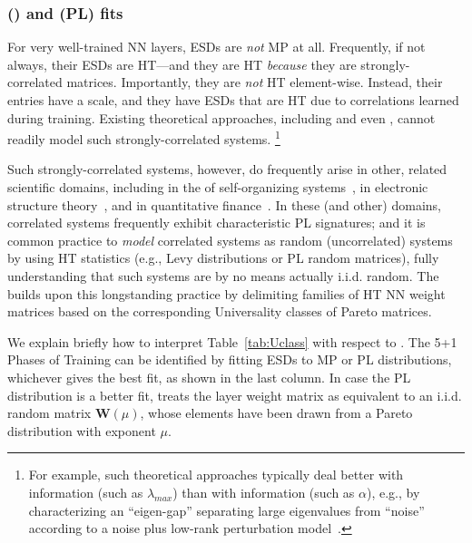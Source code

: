 \subsubsection{\HeavyTailed \RandomMatrixTheory (\HTRMT) and \PowerLaw (PL) fits}
\label{sxn:htsr_pl_fits}

For very well-trained NN layers, ESDs are \emph{not} MP at all.
Frequently, if not always, their ESDs are HT---and they are HT \emph{because} they are strongly-correlated matrices.  
Importantly, they are \emph{not} HT element-wise.
Instead, their entries have a scale, and they have ESDs that are HT due to correlations learned during training. 
Existing theoretical approaches, including \SLT and even \STATMECH, cannot readily model such strongly-correlated systems.%
\footnote{For example, such theoretical approaches typically deal better with \emph{\Scale} information (such as $\lambda_{max}$) than with 
\emph{\Shape} information (such as $\alpha$), e.g., by characterizing an ``eigen-gap'' separating large eigenvalues from 
``noise''~\cite{bach2006_JMLR} according to a noise plus low-rank perturbation model~\cite{BFR11}.}

Such strongly-correlated systems, however, do frequently arise in other, related scientific domains, including
in the \STATMECH of self-organizing systems~\cite{bak97a,SornetteBook}, 
in electronic structure theory~\cite{Martin1996,Martin1998,martin1996_CPL}, and
in quantitative finance~\cite{bouchaud1999,bouchaud2005,potters_bouchaud_2020}. 
In these (and other) domains, correlated systems frequently exhibit characteristic PL signatures; and it is common practice to \emph{model} correlated systems as random (uncorrelated) systems by using HT statistics (e.g., Levy distributions or PL random matrices), fully understanding that such systems are by no means actually i.i.d. random.
The \HTSR \Phenomenology builds upon this longstanding practice by 
delimiting families of HT NN weight matrices based on the corresponding Universality classes of Pareto matrices. 

We explain briefly how to interpret Table~\ref{tab:Uclass} with respect to \HTRMT. The 5+1 Phases of Training can be 
identified by fitting ESDs to MP or PL distributions, whichever gives the best fit, as shown in the last column.
In case the PL distribution is a better fit, \HTSR \Phenomenology treats the layer weight matrix as 
equivalent to an i.i.d. random matrix $\mathbf{W}(\mu)$, whose elements have been drawn from a Pareto distribution 
with exponent $\mu$. 


